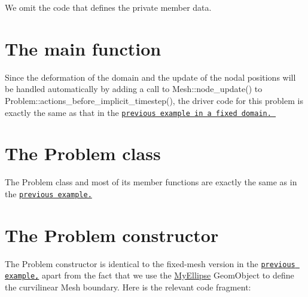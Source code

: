 We omit the code that defines the private member data.



 

\hypertarget{index_main}{}\section{The main function}\label{index_main}
Since the deformation of the domain and the update of the nodal positions will be handled automatically by adding a call to {\ttfamily Mesh\+::node\+\_\+update()} to {\ttfamily Problem\+::actions\+\_\+before\+\_\+implicit\+\_\+timestep()}, the driver code for this problem is exactly the same as that in the \href{../../two_d_unsteady_heat_adapt/html/index.html}{\tt previous example in a fixed domain. }



 

\hypertarget{index_problem_class}{}\section{The Problem class}\label{index_problem_class}
The {\ttfamily Problem} class and most of its member functions are exactly the same as in the \href{../../two_d_unsteady_heat/html/index.html}{\tt previous example.}



 

\hypertarget{index_constructor}{}\section{The Problem constructor}\label{index_constructor}
The {\ttfamily Problem} constructor is identical to the fixed-\/mesh version in the \href{../../two_d_unsteady_heat/html/index.html}{\tt previous example,} apart from the fact that we use the {\ttfamily \hyperlink{classMyEllipse}{My\+Ellipse}} {\ttfamily Geom\+Object} to define the curvilinear {\ttfamily Mesh} boundary. Here is the relevant code fragment\+:


